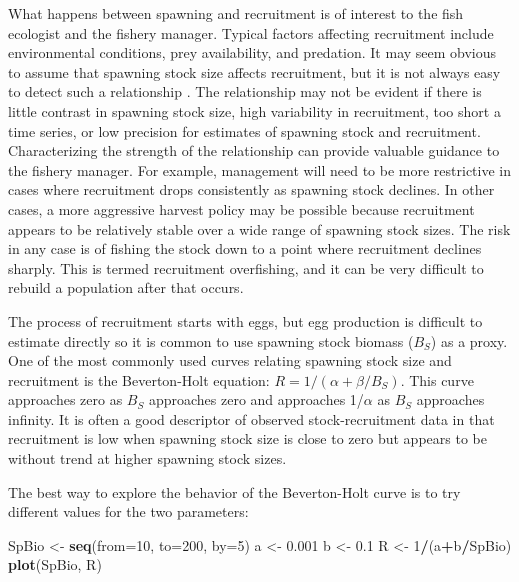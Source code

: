 \documentclass[
]{krantz}
\makeatletter
\newenvironment{Shaded}{\begin{snugshade}}{\end{snugshade}}
\newcommand{\AttributeTok}[1]{\textcolor[rgb]{0.27,0.27,0.27}{#1}}
\newcommand{\DecValTok}[1]{\textcolor[rgb]{0.06,0.06,0.06}{#1}}
\newcommand{\FloatTok}[1]{\textcolor[rgb]{0.06,0.06,0.06}{#1}}
\newcommand{\FunctionTok}[1]{\textcolor[rgb]{0.27,0.27,0.27}{\textbf{#1}}}
\newcommand{\NormalTok}[1]{#1}
\newcommand{\OtherTok}[1]{\textcolor[rgb]{0.37,0.37,0.37}{#1}}
\newcommand{\SpecialCharTok}[1]{\textcolor[rgb]{0.43,0.43,0.43}{\textbf{#1}}}
\newenvironment{kframe}{%
\medskip{}
\setlength{\fboxsep}{.8em}
 \def\at@end@of@kframe{}%
 \ifinner\ifhmode%
  \def\at@end@of@kframe{\end{minipage}}%
  \begin{minipage}{\columnwidth}%
 \fi\fi%
 \def\FrameCommand##1{\hskip\@totalleftmargin \hskip-\fboxsep
 \colorbox{shadecolor}{##1}\hskip-\fboxsep
     \hskip-\linewidth \hskip-\@totalleftmargin \hskip\columnwidth}%
 \MakeFramed {\advance\hsize-\width
   \@totalleftmargin\z@ \linewidth\hsize
   \@setminipage}}%
 {\par\unskip\endMakeFramed%
 \at@end@of@kframe}
\renewenvironment{Shaded}{\begin{kframe}}{\end{kframe}}
\makeatother
\begin{document}
What happens between spawning and recruitment is of interest to the fish ecologist and the fishery manager. Typical factors affecting recruitment include environmental conditions, prey availability, and predation. It may seem obvious to assume that spawning stock size affects recruitment, but it is not always easy to detect such a relationship \citep{hilborn.walters_1992}. The relationship may not be evident if there is little contrast in spawning stock size, high variability in recruitment, too short a time series, or low precision for estimates of spawning stock and recruitment. Characterizing the strength of the relationship can provide valuable guidance to the fishery manager. For example, management will need to be more restrictive in cases where recruitment drops consistently as spawning stock declines. In other cases, a more aggressive harvest policy may be possible because recruitment appears to be relatively stable over a wide range of spawning stock sizes. The risk in any case is of fishing the stock down to a point where recruitment declines sharply. This is termed recruitment overfishing, and it can be very difficult to rebuild a population after that occurs.

The process of recruitment starts with eggs, but egg production is difficult to estimate directly so it is common to use spawning stock biomass (\(B_S\)) as a proxy. One of the most commonly used curves relating spawning stock size and recruitment is the Beverton-Holt equation: \(R=1/(\alpha +\beta/B_S)\). This curve approaches zero as \(B_S\) approaches zero and approaches 1/\(\alpha\) as \(B_S\) approaches infinity. It is often a good descriptor of observed stock-recruitment data in that recruitment is low when spawning stock size is close to zero but appears to be without trend at higher spawning stock sizes.

The best way to explore the behavior of the Beverton-Holt curve is to try different values for the two parameters:

\begin{Shaded}
\begin{Highlighting}[]
\NormalTok{SpBio }\OtherTok{\textless{}{-}} \FunctionTok{seq}\NormalTok{(}\AttributeTok{from=}\DecValTok{10}\NormalTok{, }\AttributeTok{to=}\DecValTok{200}\NormalTok{, }\AttributeTok{by=}\DecValTok{5}\NormalTok{)}
\NormalTok{a }\OtherTok{\textless{}{-}} \FloatTok{0.001}
\NormalTok{b }\OtherTok{\textless{}{-}} \FloatTok{0.1}
\NormalTok{R }\OtherTok{\textless{}{-}} \DecValTok{1}\SpecialCharTok{/}\NormalTok{(a}\SpecialCharTok{+}\NormalTok{b}\SpecialCharTok{/}\NormalTok{SpBio)}
\FunctionTok{plot}\NormalTok{(SpBio, R)}
\end{Highlighting}
\end{Shaded}
\end{document}
